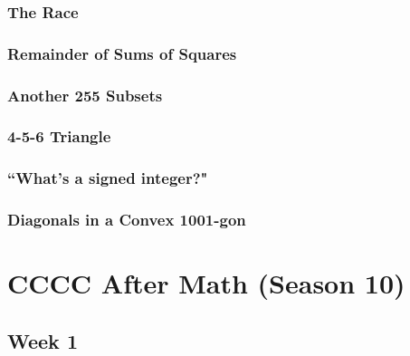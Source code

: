 \documentclass[titlepage=true]{scrartcl}
\begin{document}
        \subsubsection{The Race}
            \label{8.2.2}  
            
        \newpage

        \subsubsection{Remainder of Sums of Squares}
            \label{8.2.3}  
            
        \newpage

        \subsubsection{Another 255 Subsets}
            \label{8.2.4}
            
        \newpage 

        \subsubsection{4-5-6 Triangle}
            \label{8.2.5}  
            
        \newpage

        \subsubsection{``What's a signed integer?"}
            \label{8.2.6}
            
        \newpage

        \subsubsection{Diagonals in a Convex 1001-gon}
            \label{8.2.7}  
            
        \newpage

\setcounter{section}{9}
\section{CCCC After Math (Season 10)}

    \subsection{Week 1}
\end{document}
